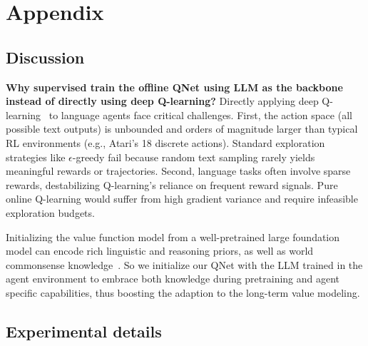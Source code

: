 \newpage
\appendix
\onecolumn
\section{Appendix}

\subsection{Discussion}

\textbf{Why supervised train the offline QNet using LLM as the backbone instead of directly using deep Q-learning?}
Directly applying deep Q-learning~\citep{qlearning} to language agents face critical challenges. First, the action space (all possible text outputs) is unbounded and orders of magnitude larger than typical RL environments (e.g., Atari's 18 discrete actions). Standard exploration strategies like $\epsilon$-greedy fail because random text sampling rarely yields meaningful rewards or trajectories. Second, language tasks often involve sparse rewards, destabilizing Q-learning's reliance on frequent reward signals. Pure online Q-learning would suffer from high gradient variance and require infeasible exploration budgets.

Initializing the value function model from a well-pretrained large foundation model can encode rich linguistic and reasoning priors, as well as world commonsense knowledge~\citep{bansal2024videophy, song-etal-2024-eto, xu2022universal, math-shepherd}. So we initialize our QNet with the LLM trained in the agent environment to embrace both knowledge during pretraining and agent specific capabilities, thus boosting the adaption to the long-term value modeling.


\subsection{Experimental details}\label{appendix:exp-details}

